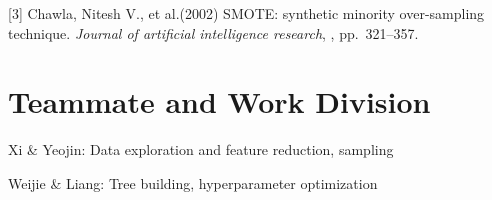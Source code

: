 \documentclass{article}
\begin{document}
[3] Chawla, Nitesh V., et al.(2002) SMOTE: synthetic minority over-sampling technique. {\it Journal of artificial intelligence research}, , pp.\ 321--357.



\section{Teammate and Work Division}

Xi \& Yeojin: Data exploration and feature reduction, sampling

Weijie \& Liang: Tree building, hyperparameter optimization




\end{document}
